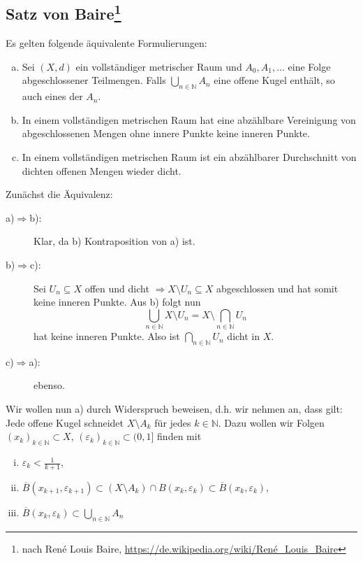 \subsection[Satz von Baire]{Satz von Baire\protect\footnote{nach René Louis Baire, \url{https://de.wikipedia.org/wiki/René_Louis_Baire}}} %
\label{sub:110} 
Es gelten folgende äquivalente Formulierungen:
\begin{enumerate}[a)]
	\item Sei $(X,d)$ ein vollständiger metrischer Raum und $A_0, A_1, \ldots $ eine Folge abgeschlossener Teilmengen. Falls $\bigcup_{n \in \mathds{N}} A_n$ eine
	offene Kugel enthält, so auch eines der $A_n$.
	\item In einem vollständigen metrischen Raum hat eine abzählbare Vereinigung von abgeschlossenen Mengen ohne innere Punkte keine inneren Punkte.
	\item In einem vollständigen metrischen Raum ist ein abzählbarer Durchschnitt von dichten offenen Mengen wieder dicht.
\end{enumerate}
Zunächst die Äquivalenz: 
\begin{description}
	\item[a)$\Rightarrow$b):] Klar, da b) Kontraposition von a) ist.
	\item[b)$\Rightarrow$c):] Sei $U_n \subseteq X$ offen und dicht $\Rightarrow X \setminus U_n \subseteq X$ abgeschlossen und hat somit keine inneren Punkte. Aus b) folgt
	nun 
	\[
		\bigcup_{n \in \mathds{N}}X \setminus U_n = X \setminus \bigcap_{n \in \mathds{N}} U_n
	\]
	hat keine inneren Punkte. Also ist $\bigcap_{n \in \mathds{N}} U_n$ dicht in $X$.
	\item[c)$\Rightarrow$a):] ebenso.
\end{description}
Wir wollen nun a) durch Widerspruch beweisen, d.h. wir nehmen an, dass gilt: Jede offene Kugel schneidet $X \setminus A_k$ für jedes $k \in \mathds{N}$. Dazu wollen wir 
Folgen $(x_k)_{k \in \mathds{N}} \subset X$, $(\varepsilon_k)_{k \in \mathds{N}} \subset (0,1]$ finden mit 
\begin{enumerate}[(i)]
	\item $\varepsilon_k < \frac{1}{k+1}$,
	\item $\overline{B}(x_{k+1}, \varepsilon_{k+1}) \subset (X \setminus A_k) \cap B(x_k, \varepsilon_k) \subset \overline{B}(x_k, \varepsilon_k)$,
	\item $\overline{B}(x_k, \varepsilon_k) \subset \bigcup_{n \in \mathds{N}} A_n$
\end{enumerate}
